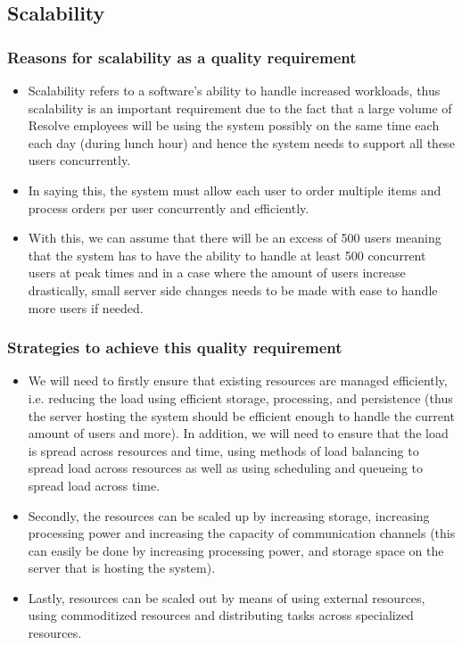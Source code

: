 \documentclass[a4paper,12pt]{article}
\begin{document}
\subsection{Scalability}
\subsubsection{Reasons for scalability as a quality requirement}
\begin{itemize}
\item Scalability refers to a software's ability to handle increased workloads, thus scalability is an important requirement due to the fact that a large volume of Resolve employees will be using the system possibly on the same time each each day (during lunch hour)  and hence the system needs to support all these users concurrently. 
\item In saying this, the system must allow each user to order multiple items and process orders per user concurrently and efficiently.
\item With this, we can assume that there will be an excess of 500 users meaning that the system has to have the ability to handle at least 500 concurrent users at peak times and in a case where the amount of users increase drastically, small server side changes needs to be made with ease to handle more users if needed.
\end{itemize}

\subsubsection{Strategies to achieve this quality requirement}
\begin{itemize}
\item We will need to firstly ensure that existing resources are managed efficiently, i.e. reducing the load using efficient storage, processing,  and persistence (thus the server hosting the system should be efficient enough to handle the current amount of users and more). In addition, we will need to ensure that the load is spread across resources and time, using methods of load balancing to spread load across resources as well as using scheduling and queueing to spread load across time.
\item Secondly, the resources can be scaled up by increasing storage, increasing processing power and increasing the capacity of communication channels (this can easily be done by increasing processing power, and storage space on the server that is hosting the system).
\item Lastly, resources can be scaled out by means of using external resources, using commoditized resources and distributing tasks across specialized resources.
\end{itemize}
\end{document}
